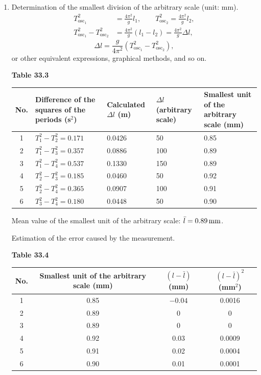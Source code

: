 \begin{enumerate}[label=(\arabic*)]
Graph of $T^2$ against the arbitrary scale on the string. (Omitted.)

\item Determination of the smallest division of the arbitrary scale (unit: mm).
\begin{align*}
T_{\mathrm{osc}_1}^2 &= \frac{4\pi^2}{g}l_1, \qquad
T_{\mathrm{osc}_2}^2 = \frac{4\pi^2}{g}l_2,\\
T_{\mathrm{osc}_1}^2 - T_{\mathrm{osc}_2}^2 &= \frac{4\pi^2}{g}(l_1 - l_2) = \frac{4\pi^2}{g}\Delta l,
\end{align*}
\begin{equation*}
\Delta l = \frac{g}{4\pi^2}\left(T_{\mathrm{osc}_1}^2 - T_{\mathrm{osc}_2}^2\right),
\end{equation*}
or other equivalent expressions, graphical methods, and so on.

\begin{center}
\small\textbf{Table 33.3}
\end{center}
\begin{center}
\small
\begin{tabular}{cp{3.6cm}p{2.1cm}p{2.3cm}p{2.6cm}}
\toprule
No. & Difference of the squares of the periods (s$^2$) & Calculated $\Delta l$ (m) & $\Delta l$ (arbitrary scale) & Smallest unit of the arbitrary scale (mm) \\
\midrule
1 & $T_1^2-T_2^2=0.171$ & 0.0426 & 50 & 0.85 \\
2 & $T_1^2-T_3^2=0.357$ & 0.0886 & 100 & 0.89 \\
3 & $T_1^2-T_4^2=0.537$ & 0.1330 & 150 & 0.89 \\
4 & $T_2^2-T_3^2=0.185$ & 0.0460 & 50 & 0.92 \\
5 & $T_2^2-T_4^2=0.365$ & 0.0907 & 100 & 0.91 \\
6 & $T_3^2-T_4^2=0.180$ & 0.0448 & 50 & 0.90 \\
\bottomrule
\end{tabular}
\end{center}

Mean value of the smallest unit of the arbitrary scale: $\bar l = 0.89\,\mathrm{mm}$.

Estimation of the error caused by the measurement.

\begin{center}
\small\textbf{Table 33.4}
\end{center}
\begin{center}
\small
\begin{tabular}{cccc}
\toprule
No. & Smallest unit of the arbitrary scale (mm) & $(l-\bar l)$ (mm) & $(l-\bar l)^2$ (mm$^2$) \\
\midrule
1 & 0.85 & $-0.04$ & 0.0016 \\
2 & 0.89 & 0 & 0 \\
3 & 0.89 & 0 & 0 \\
4 & 0.92 & 0.03 & 0.0009 \\
5 & 0.91 & 0.02 & 0.0004 \\
6 & 0.90 & 0.01 & 0.0001 \\
\bottomrule
\end{tabular}
\end{center}


\end{enumerate}
